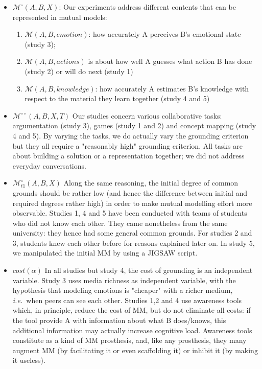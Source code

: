 \documentclass{report}
\newcommand{\ie}{{\textit{i.e.\ }}}
\begin{document}
\begin{itemize}
    \item $\mathcal{M}^{\circ}(A,B,X)$: Our experiments address different contents that can be
        represented in mutual models:

        \begin{enumerate}
            \item $\mathcal{M}(A,B,emotion)$: how accurately A perceives B's emotional state
                (study 3); 

            \item $\mathcal{M}(A,B,actions)$ is about how well A guesses what action B has
                done (study 2) or will do next  (study 1)

            \item $\mathcal{M} (A,B,knowledge)$: how accurately A estimates B's knowledge
                with respect to the material they learn together (study 4 and 5)

        \end{enumerate}

    \item $\mathcal{M}^{\circ\circ}(A,B,X,T)$ Our studies concern various collaborative tasks:
        argumentation (study 3), games (study 1 and 2) and concept mapping
        (study 4 and 5). By varying the tasks, we do actually vary the grounding
        criterion but they all require a "reasonably high" grounding criterion.
        All tasks are about building a solution or a representation together; we
        did not address everyday conversations. 

    \item $\mathcal{M}^{\circ}_{t1}(A,B,X)$ Along the same reasoning, the initial degree
        of common grounds should be rather low (and hence the difference between
        initial and required degrees rather high) in order to make mutual
        modelling effort more observable. Studies 1, 4 and 5 have been conducted
        with teams of students who did not know each other. They came
        nonetheless from the same university: they hence had some general common
        grounds.  For studies 2 and 3, students knew each other before for
        reasons explained later on. In study 5, we manipulated the initial MM by
        using a JIGSAW script.

    \item $cost(\alpha)$ In all studies but study 4, the cost of  grounding is
        an independent variable. Study 3 uses media richness as independent
        variable, with the hypothesis that modeling emotions is "cheaper" with a
        richer medium, \ie  when peers can see each other.  Studies 1,2 and 4
        use awareness tools which, in principle, reduce the cost of MM, but do
        not eliminate all costs: if the tool provide A with information about
        what B does/knows, this additional information may actually increase
        cognitive load. Awareness tools constitute as a kind of MM prosthesis,
        and, like any prosthesis, they many augment MM (by facilitating it or
        even scaffolding it) or inhibit it (by making it useless).

\end{itemize}
\end{document}
